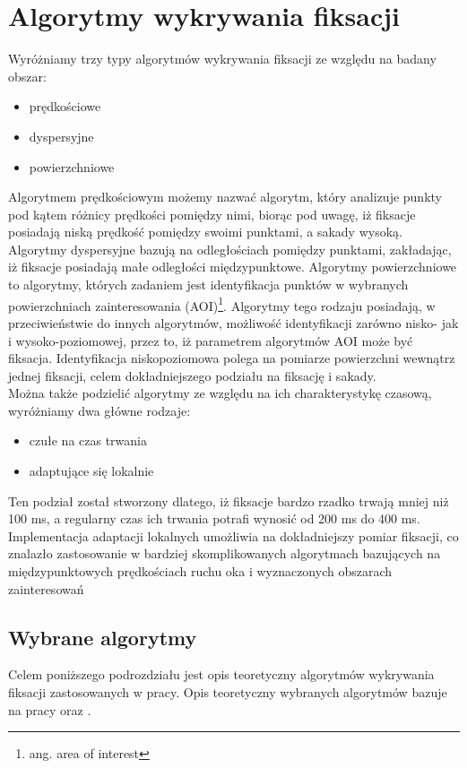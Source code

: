 \section{Algorytmy wykrywania fiksacji}
\label{sec:fixations}
Wyróżniamy trzy typy algorytmów wykrywania fiksacji ze względu na badany obszar:
\begin{itemize}
    \item prędkościowe
    \item dyspersyjne
    \item powierzchniowe
\end{itemize} 
Algorytmem prędkościowym możemy nazwać algorytm, który analizuje punkty pod kątem różnicy prędkości pomiędzy nimi, biorąc pod uwagę, iż fiksacje posiadają niską prędkość pomiędzy swoimi punktami, a sakady wysoką. Algorytmy dyspersyjne bazują na odległościach pomiędzy punktami, zakładając, iż fiksacje posiadają małe odległości międzypunktowe. Algorytmy powierzchniowe to algorytmy, których zadaniem jest identyfikacja punktów w wybranych powierzchniach zainteresowania (AOI)\footnote{ang. area of interest}. Algorytmy tego rodzaju posiadają, w przeciwieństwie do innych algorytmów, możliwość identyfikacji zarówno nisko- jak i wysoko-poziomowej, przez to, iż parametrem algorytmów AOI może być fiksacja. Identyfikacja niskopoziomowa polega na pomiarze powierzchni wewnątrz jednej fiksacji, celem dokładniejszego podziału na fiksację i sakady.\\ 
Można także podzielić algorytmy ze względu na ich charakterystykę czasową, wyróżniamy dwa główne rodzaje:
\begin{itemize}
    \item czułe na czas trwania
    \item adaptujące się lokalnie
\end{itemize}
Ten podział został stworzony dlatego, iż fiksacje bardzo rzadko trwają mniej niż 100 ms, a regularny czas ich trwania potrafi wynosić od 200 ms do 400 ms. Implementacja adaptacji lokalnych umożliwia na dokładniejszy pomiar fiksacji, co znalazło zastosowanie w bardziej skomplikowanych algorytmach bazujących na międzypunktowych prędkościach ruchu oka i wyznaczonych obszarach zainteresowań
\subsection{Wybrane algorytmy}
\label{ssec:algorithms}
Celem poniższego podrozdziału jest opis teoretyczny algorytmów wykrywania fiksacji zastosowanych w pracy. Opis teoretyczny wybranych algorytmów bazuje na pracy \cite{Main} oraz \cite{EvaluationMethodology}.
